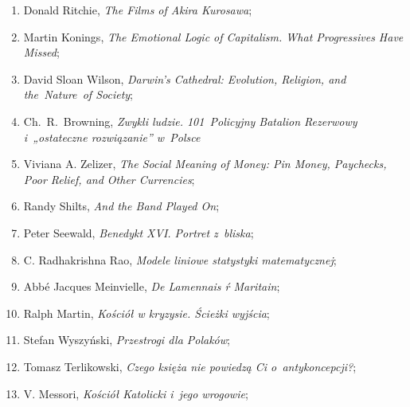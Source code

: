 \documentclass[a4paper,11pt]{article}
\begin{document}
\begin{enumerate}
\item Donald Ritchie, \textit{The Films of Akira Kurosawa};



\item Martin Konings, \textit{The Emotional Logic of Capitalism. What
    Progressives Have Missed};



\item David Sloan Wilson, \textit{Darwin's Cathedral: Evolution,
    Religion, and the~Nature~of Society};



\item Ch.~R.~Browning, \textit{Zwykli ludzie. 101~Policyjny Batalion
    Rezerwowy i~„ostateczne rozwiązanie” w~Polsce}



\item Viviana A. Zelizer, \textit{The Social Meaning of Money: Pin
    Money, Paychecks, Poor Relief, and Other Currencies};



\item Randy Shilts, \textit{And the Band Played On};



\item Peter Seewald, \textit{Benedykt XVI. Portret z~bliska};



\item C. Radhakrishna Rao, \textit{Modele liniowe statystyki matematycznej};



\item Abbé Jacques Meinvielle, \textit{De Lamennais ŕ Maritain};



\item Ralph Martin, \textit{Kościół w kryzysie. Ścieżki wyjścia};



\item Stefan Wyszyński, \textit{Przestrogi dla Polaków};



\item Tomasz Terlikowski, \textit{Czego księża nie powiedzą Ci
    o~antykoncepcji?};



\item V. Messori, \textit{Kościół Katolicki i~jego wrogowie};




\end{enumerate}
\end{document}
